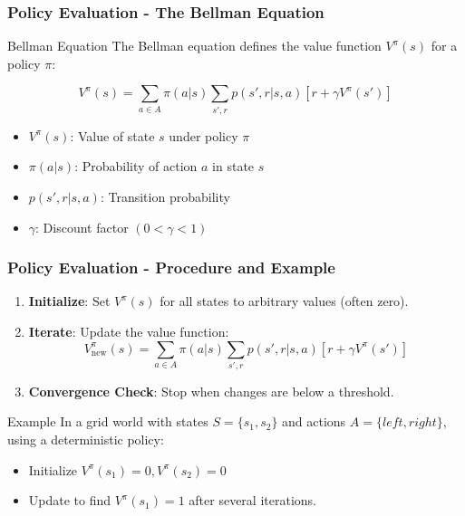 \documentclass{beamer}
\begin{document}
\begin{frame}[fragile]
    \frametitle{Policy Evaluation - The Bellman Equation}
    \begin{block}{Bellman Equation}
        The Bellman equation defines the value function \( V^{\pi}(s) \) for a policy \( \pi \):

        \[
        V^{\pi}(s) = \sum_{a \in A} \pi(a|s) \sum_{s', r} p(s', r | s, a) [ r + \gamma V^{\pi}(s') ]
        \]
    \end{block}
    \begin{itemize}
        \item \( V^{\pi}(s) \): Value of state \( s \) under policy \( \pi \)
        \item \( \pi(a|s) \): Probability of action \( a \) in state \( s \)
        \item \( p(s', r | s, a) \): Transition probability
        \item \( \gamma \): Discount factor \( (0 < \gamma < 1) \)
    \end{itemize}
\end{frame}

\begin{frame}[fragile]
    \frametitle{Policy Evaluation - Procedure and Example}
    \begin{enumerate}
        \item \textbf{Initialize}: Set \( V^{\pi}(s) \) for all states to arbitrary values (often zero).
        \item \textbf{Iterate}: Update the value function:
        \[
        V^{\pi}_{\text{new}}(s) = \sum_{a \in A} \pi(a|s) \sum_{s', r} p(s', r | s, a) [ r + \gamma V^{\pi}(s') ]
        \]
        \item \textbf{Convergence Check}: Stop when changes are below a threshold.
    \end{enumerate}
    
    \begin{block}{Example}
        In a grid world with states \( S = \{s_1, s_2\} \) and actions \( A = \{left, right\} \), using a deterministic policy:
        \begin{itemize}
            \item Initialize \( V^{\pi}(s_1) = 0, V^{\pi}(s_2) = 0 \)
            \item Update to find \( V^{\pi}(s_1) = 1 \) after several iterations.
        \end{itemize}
    \end{block}
\end{frame}
\end{document}
